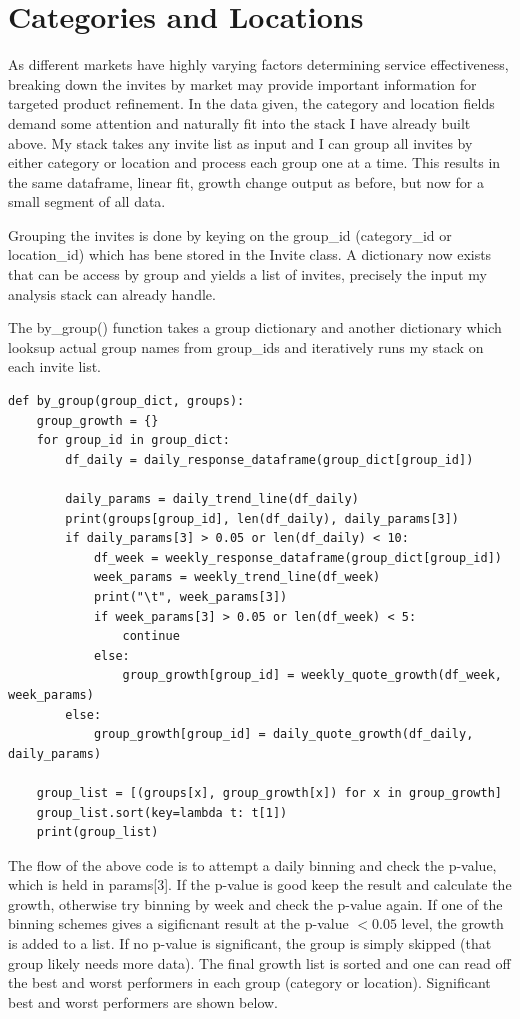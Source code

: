 \documentclass{article}[12pt]
\begin{document}
\section{Categories and Locations}

As different markets have highly varying factors determining service effectiveness, breaking
down the invites by market may provide important information for targeted product refinement.
In the data given, the category and location fields demand some attention and naturally fit into
the stack I have already built above. My stack takes any invite list as input and I can group all
invites by either category or location and process each group one at a time. This results in the same
dataframe, linear fit, growth change output as before, but now for a small segment of all data.

Grouping the invites is done by keying on the group\_id (category\_id or location\_id) which has
bene stored in the Invite class. A dictionary now exists that can be access by group and yields a
list of invites, precisely the input my analysis stack can already handle.

The by\_group() function takes a group dictionary and another dictionary which looksup actual
group names from group\_ids and iteratively runs my stack on each invite list.

\begin{verbatim}
def by_group(group_dict, groups):
    group_growth = {}
    for group_id in group_dict:
        df_daily = daily_response_dataframe(group_dict[group_id])

        daily_params = daily_trend_line(df_daily)
        print(groups[group_id], len(df_daily), daily_params[3])
        if daily_params[3] > 0.05 or len(df_daily) < 10:
            df_week = weekly_response_dataframe(group_dict[group_id])
            week_params = weekly_trend_line(df_week)
            print("\t", week_params[3])
            if week_params[3] > 0.05 or len(df_week) < 5:
                continue
            else:
                group_growth[group_id] = weekly_quote_growth(df_week, week_params)
        else:
            group_growth[group_id] = daily_quote_growth(df_daily, daily_params)

    group_list = [(groups[x], group_growth[x]) for x in group_growth]
    group_list.sort(key=lambda t: t[1])
    print(group_list)
\end{verbatim}

The flow of the above code is to attempt a daily binning and check the p-value, which is held in params[3]. If the p-value is good keep the result and calculate the growth, otherwise try binning by week and check the p-value again. If one of the binning schemes gives a sigificnant result at the p-value $< 0.05$ level, the growth is added to a list. If no p-value is significant, the group is simply skipped (that group likely needs more data). The final growth list is sorted and one can read off the best and worst performers in each group (category or location). Significant best and worst performers are shown below.
\end{document}
